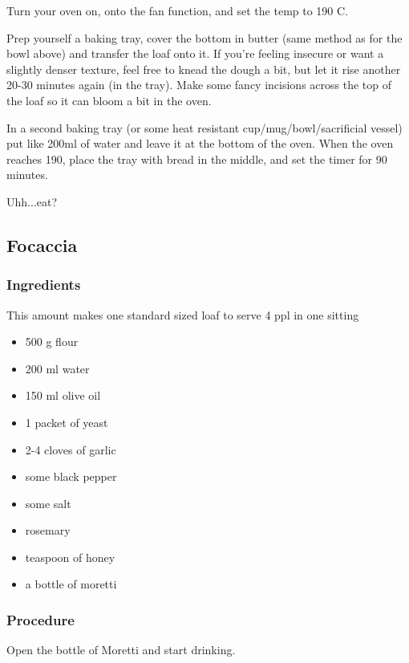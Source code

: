 \documentclass[10pt]{article}
\begin{document}
Turn your oven on, onto the fan function, and set the temp to 190 C.\par

Prep yourself a baking tray, cover the bottom in butter (same method as for the bowl above) and transfer the loaf onto it. If you're feeling insecure or want a slightly denser texture, feel free to knead the dough a bit, but let it rise another 20-30 minutes again (in the tray). Make some fancy incisions across the top of the loaf so it can bloom a bit in the oven. \par

In a second baking tray (or some heat resistant cup/mug/bowl/sacrificial vessel) put like 200ml of water and leave it at the bottom of the oven. When the oven reaches 190, place the tray with bread in the middle, and set the timer for 90 minutes.\par

Uhh...eat?
\subsection{Focaccia}%
\label{sub:focaccia}

\subsubsection{Ingredients}%
\label{ssub:focaccia_ingredients}
This amount makes one standard sized loaf to serve 4 ppl in one sitting

\begin{itemize}
	\item 500 g flour
	\item 200 ml water
	\item 150 ml olive oil
	\item 1 packet of yeast
	\item 2-4 cloves of garlic
	\item some black pepper
	\item some salt
	\item rosemary
	\item teaspoon of honey
	\item a bottle of moretti
\end{itemize}
\subsubsection{Procedure}%
\label{ssub:focaccia_procedure}

Open the bottle of Moretti and start drinking.\par
\end{document}
